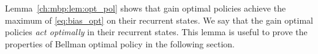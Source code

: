 Lemma~\ref{ch:mbp:lem:opt_pol} shows that gain optimal policies achieve the maximum of \eqref{eq:bias_opt} on their recurrent states.
We say that the gain optimal policies \emph{act optimally} in their recurrent states.
This lemma is useful to prove the properties of Bellman optimal policy in the following section.

